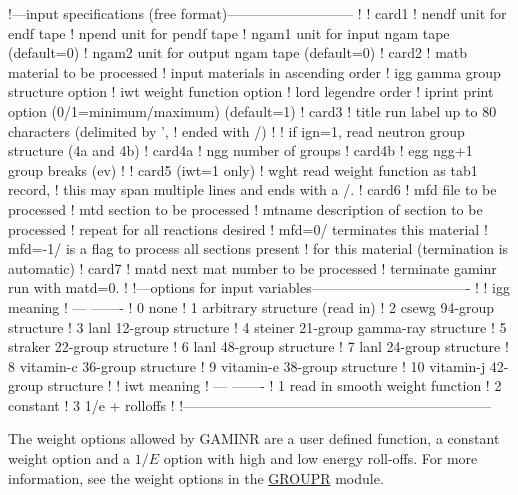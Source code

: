 \small
\begin{ccode}

   !---input specifications (free format)---------------------------
   !
   ! card1
   !    nendf   unit for endf tape
   !    npend   unit for pendf tape
   !    ngam1   unit for input ngam tape (default=0)
   !    ngam2   unit for output ngam tape (default=0)
   ! card2
   !    matb    material to be processed
   !            input materials in ascending order
   !    igg     gamma group structure option
   !    iwt     weight function option
   !    lord    legendre order
   !    iprint  print option (0/1=minimum/maximum) (default=1)
   ! card3
   !    title   run label up to 80 characters (delimited by ',
   !            ended with /)
   !
   !          if ign=1, read neutron group structure (4a and 4b)
   ! card4a
   !    ngg     number of groups
   ! card4b
   !    egg     ngg+1 group breaks (ev)
   !
   ! card5      (iwt=1 only)
   !    wght    read weight function as tab1 record,
   !            this may span multiple lines and ends with a /.
   ! card6
   !    mfd     file to be processed
   !    mtd     section to be processed
   !    mtname  description of section to be processed
   !            repeat for all reactions desired
   !            mfd=0/ terminates this material
   !            mfd=-1/ is a flag to process all sections present
   !            for this material  (termination is automatic)
   ! card7
   !    matd    next mat number to be processed
   !            terminate gaminr run with matd=0.
   !
   !---options for input variables----------------------------------
   !
   !        igg     meaning
   !        ---     -------
   !         0      none
   !         1      arbitrary structure (read in)
   !         2      csewg 94-group structure
   !         3      lanl 12-group structure
   !         4      steiner 21-group gamma-ray structure
   !         5      straker 22-group structure
   !         6      lanl 48-group structure
   !         7      lanl 24-group structure
   !         8      vitamin-c 36-group structure
   !         9      vitamin-e 38-group structure
   !         10      vitamin-j 42-group structure
   !
   !        iwt     meaning
   !        ---     -------
   !         1      read in smooth weight function
   !         2      constant
   !         3      1/e + rolloffs
   !
   !------------------------------------------------------------------

\end{ccode}
\normalsize

The weight options allowed by GAMINR are a user defined function, a constant
weight option and a $1/E$ option with high and low energy roll-offs. For more
information, see the weight options in the \hyperlink{sGROUPRhy}{GROUPR} module.

